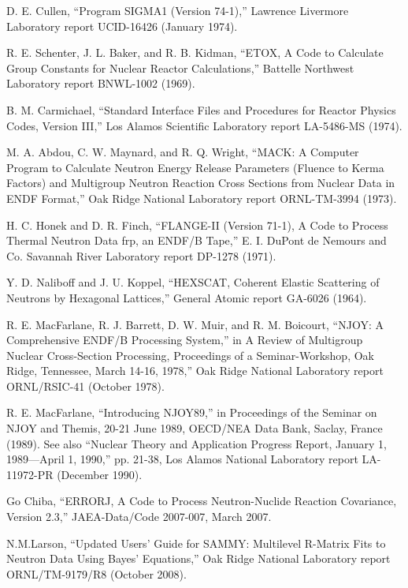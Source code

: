 \documentclass[11pt,twoside]{NJOYMan}
\begin{document}
\begin{thebibliography}{99}
\begin{singlespace}
 D. E. Cullen, ``Program SIGMA1 (Version 74-1),''
  Lawrence Livermore Laboratory report UCID-16426 (January 1974).

 R. E. Schenter, J. L. Baker, and R. B. Kidman,
  ``ETOX, A Code to Calculate Group Constants for Nuclear Reactor
  Calculations,'' Battelle Northwest Laboratory report
  BNWL-1002 (1969).

 B. M. Carmichael, ``Standard Interface Files and
  Procedures for Reactor Physics Codes, Version III,'' Los Alamos
  Scientific Laboratory report LA-5486-MS (1974).

 M. A. Abdou, C. W. Maynard, and R. Q. Wright,
  ``MACK: A Computer Program to Calculate Neutron Energy Release
  Parameters (Fluence to Kerma Factors) and Multigroup
  Neutron Reaction Cross Sections from Nuclear Data in ENDF
  Format,'' Oak Ridge National Laboratory report ORNL-TM-3994
  (1973).

 H. C. Honek and D. R. Finch, ``FLANGE-II
  (Version 71-1), A Code to Process Thermal Neutron Data frp, an
  ENDF/B Tape,'' E. I. DuPont de Nemours and Co. Savannah River
  Laboratory report DP-1278 (1971).

 Y. D. Naliboff and J. U. Koppel, ``HEXSCAT,
  Coherent Elastic Scattering of Neutrons by Hexagonal Lattices,''
  General Atomic report GA-6026 (1964).

 R. E. MacFarlane, R. J. Barrett, D. W. Muir, and
  R. M. Boicourt, ``NJOY: A Comprehensive ENDF/B Processing System,''
  in A Review of Multigroup Nuclear Cross-Section Processing,
  Proceedings of a Seminar-Workshop, Oak Ridge, Tennessee,
  March 14-16, 1978,'' Oak Ridge National Laboratory report
  ORNL/RSIC-41 (October 1978).

 R. E. MacFarlane, ``Introducing NJOY89,'' in
  Proceedings of the Seminar on NJOY and Themis, 20-21 June 1989,
  OECD/NEA Data Bank, Saclay, France (1989).  See also ``Nuclear
  Theory and Application Progress Report, January 1, 1989---April
  1, 1990,'' pp. 21-38, Los Alamos National Laboratory report
  LA-11972-PR (December 1990).

 Go Chiba, ``ERRORJ, A Code to Process Neutron-Nuclide
  Reaction Covariance, Version 2.3,'' JAEA-Data/Code 2007-007, March 2007.

 N.M.Larson, ``Updated Users' Guide for SAMMY:
  Multilevel R-Matrix Fits to Neutron Data Using Bayes' Equations,''
  Oak Ridge National Laboratory report ORNL/TM-9179/R8 (October 2008).


\end{singlespace}
\end{thebibliography}
\end{document}

